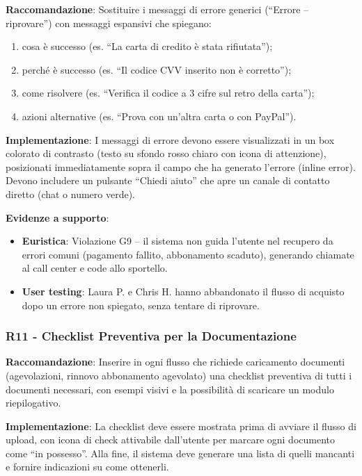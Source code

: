 \documentclass[11pt,a4paper]{article}
\begin{document}
\textbf{Raccomandazione}: Sostituire i messaggi di errore generici
(“Errore -- riprovare”) con messaggi espansivi che spiegano:
\begin{enumerate}
    \item cosa \`e successo (es. “La carta di credito \`e stata rifiutata”);
    \item perch\'e \`e successo (es. “Il codice CVV inserito non \`e corretto”);
    \item come risolvere (es. “Verifica il codice a 3 cifre sul retro della
    carta”);
    \item azioni alternative (es. “Prova con un'altra carta o con PayPal”).
\end{enumerate}

\textbf{Implementazione}: I messaggi di errore devono essere visualizzati in
un box colorato di contrasto (testo su sfondo rosso chiaro con icona di
attenzione), posizionati immediatamente sopra il campo che ha generato
l'errore (inline error). Devono includere un pulsante “Chiedi aiuto” che apre
un canale di contatto diretto (chat o numero verde).

\textbf{Evidenze a supporto}:
\begin{itemize}
    \item \textbf{Euristica}: Violazione G9 -- il sistema non guida l'utente
    nel recupero da errori comuni (pagamento fallito, abbonamento scaduto),
    generando chiamate al call center e code allo sportello.
    \item \textbf{User testing}: Laura P. e Chris H. hanno abbandonato
    il flusso di acquisto dopo un errore non spiegato, senza tentare
    di riprovare.
\end{itemize}

\subsubsection{R11 - Checklist Preventiva per la Documentazione}
\label{rec:R11}

\textbf{Raccomandazione}: Inserire in ogni flusso che richiede caricamento
documenti (agevolazioni, rinnovo abbonamento agevolato) una checklist
preventiva di tutti i documenti necessari, con esempi visivi e la possibilit\`a
di scaricare un modulo riepilogativo.

\textbf{Implementazione}: La checklist deve essere mostrata prima di avviare
il flusso di upload, con icona di check attivabile dall'utente per marcare
ogni documento come “in possesso”. Alla fine, il sistema deve generare una
lista di quelli mancanti e fornire indicazioni su come ottenerli.
\end{document}
